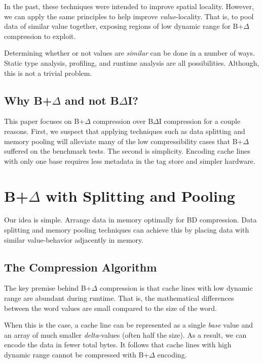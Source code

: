 \documentclass[pageno]{jpaper}
\begin{document}
In the past, these techniques were intended to improve spatial locality. However, we can apply the same principles to help improve \textit{value}-locality. That is, to pool data of similar value together, exposing regions of low dynamic range for B+$\Delta$ compression to exploit.

Determining whether or not values are \textit{similar} can be done in a number of ways. Static type analysis, profiling, and runtime analysis are all possibilities.  Although, this is not a trivial problem.


\subsection{Why B+$\Delta$ and not B$\Delta$I?}

This paper focuses on B+$\Delta$ compression over B$\Delta$I compression for a couple reasons. First, we suspect that applying techniques such as data splitting and memory pooling will alleviate many of the low compressibility cases that B+$\Delta$ suffered on the benchmark tests. The second is simplicity. Encoding cache lines with only one base requires less metadata in the tag store and simpler hardware.


\section{B+$\Delta$ with Splitting and Pooling}

Our idea is simple. Arrange data in memory optimally for BD compression. Data splitting and memory pooling techniques can achieve this by placing data with similar value-behavior adjacently in memory.


\subsection{The Compression Algorithm}

The key premise behind B+$\Delta$  compression is that cache lines with low dynamic range are abundant during runtime. That is, the mathematical differences between the word values are small compared to the size of the word.

When this is the case, a cache line can be represented as a single \textit{base} value and an array of much smaller \textit{delta}-values (often half the size). As a result, we can encode the data in fewer total bytes. It follows that cache lines with high dynamic range cannot be compressed with B+$\Delta$ encoding.
\end{document}
